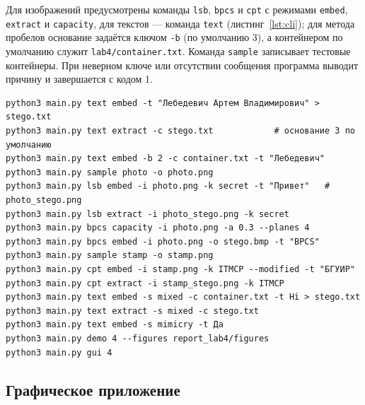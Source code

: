 \documentclass[14pt,a4paper]{extarticle}
\begin{document}
Для изображений предусмотрены команды \texttt{lsb}, \texttt{bpcs} и \texttt{cpt} с
режимами \texttt{embed}, \texttt{extract} и \texttt{capacity}, для текстов --- команда
\texttt{text} (листинг~\ref{lst:cli}); для метода пробелов основание задаётся
ключом \texttt{-b} (по умолчанию 3), а контейнером по умолчанию служит
\texttt{lab4/container.txt}. Команда \texttt{sample} записывает тестовые
контейнеры. При неверном ключе или отсутствии сообщения программа выводит причину и
завершается с кодом 1.

\begin{lstlisting}[style=shell, caption={Примеры запуска}, label={lst:cli}]
python3 main.py text embed -t "Лебедевич Артем Владимирович" > stego.txt
python3 main.py text extract -c stego.txt            # основание 3 по умолчанию
python3 main.py text embed -b 2 -c container.txt -t "Лебедевич"
python3 main.py sample photo -o photo.png
python3 main.py lsb embed -i photo.png -k secret -t "Привет"   # photo_stego.png
python3 main.py lsb extract -i photo_stego.png -k secret
python3 main.py bpcs capacity -i photo.png -a 0.3 --planes 4
python3 main.py bpcs embed -i photo.png -o stego.bmp -t "BPCS"
python3 main.py sample stamp -o stamp.png
python3 main.py cpt embed -i stamp.png -k ITMCP --modified -t "БГУИР"
python3 main.py cpt extract -i stamp_stego.png -k ITMCP
python3 main.py text embed -s mixed -c container.txt -t Hi > stego.txt
python3 main.py text extract -s mixed -c stego.txt
python3 main.py text embed -s mimicry -t Да
python3 main.py demo 4 --figures report_lab4/figures
python3 main.py gui 4
\end{lstlisting}

\subsection{Графическое приложение}
\end{document}
